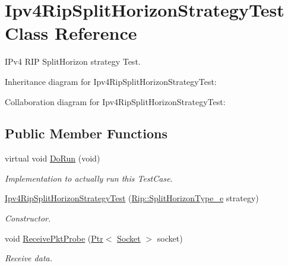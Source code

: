 \hypertarget{classIpv4RipSplitHorizonStrategyTest}{}\section{Ipv4\+Rip\+Split\+Horizon\+Strategy\+Test Class Reference}
\label{classIpv4RipSplitHorizonStrategyTest}


I\+Pv4 R\+IP Split\+Horizon strategy Test.  




Inheritance diagram for Ipv4\+Rip\+Split\+Horizon\+Strategy\+Test\+:


Collaboration diagram for Ipv4\+Rip\+Split\+Horizon\+Strategy\+Test\+:
\subsection*{Public Member Functions}
\begin{DoxyCompactItemize}
\item 
virtual void \hyperlink{classIpv4RipSplitHorizonStrategyTest_a2e1df0675ad2712888aa499ee0f7eac2}{Do\+Run} (void)
\begin{DoxyCompactList}\small\item\em Implementation to actually run this Test\+Case. \end{DoxyCompactList}\item 
\hyperlink{classIpv4RipSplitHorizonStrategyTest_ab0e10d48c7468ae4b16a3bf60b31154c}{Ipv4\+Rip\+Split\+Horizon\+Strategy\+Test} (\hyperlink{classns3_1_1Rip_aa65e80d926399a90bc81b30dfc9404a4}{Rip\+::\+Split\+Horizon\+Type\+\_\+e} strategy)
\begin{DoxyCompactList}\small\item\em Constructor. \end{DoxyCompactList}\item 
void \hyperlink{classIpv4RipSplitHorizonStrategyTest_a45b34f91d22c8caae4960907300cba65}{Receive\+Pkt\+Probe} (\hyperlink{classns3_1_1Ptr}{Ptr}$<$ \hyperlink{classns3_1_1Socket}{Socket} $>$ socket)
\begin{DoxyCompactList}\small\item\em Receive data. \end{DoxyCompactList}\end{DoxyCompactItemize}
